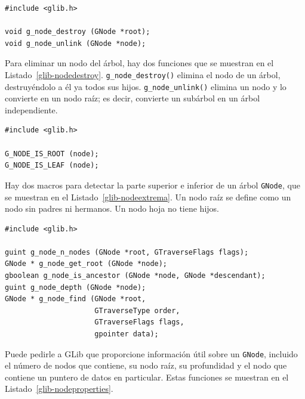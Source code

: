 \begin{lstlisting}[float, caption={Destruyendo un \lstinline{GNode}}, label=glib-nodedestroy]
#include <glib.h>

void g_node_destroy (GNode *root);
void g_node_unlink (GNode *node);
\end{lstlisting}

Para eliminar un nodo del árbol, hay dos funciones que se muestran en el Listado~\ref{glib-nodedestroy}. \lstinline{g_node_destroy()} elimina el nodo de un árbol, destruyéndolo a él ya todos sus hijos. \lstinline{g_node_unlink()} elimina un nodo y lo convierte en un nodo raíz; es decir, convierte un subárbol en un árbol independiente.

\begin{lstlisting}[float, caption={Predicados para \lstinline{GNode}}, label=glib-nodeextrema]
#include <glib.h>

G_NODE_IS_ROOT (node);
G_NODE_IS_LEAF (node);
\end{lstlisting}

Hay dos macros para detectar la parte superior e inferior de un árbol \lstinline{GNode}, que se muestran en el Listado~\ref{glib-nodeextrema}. Un nodo raíz se define como un nodo sin padres ni hermanos. Un nodo hoja no tiene hijos.

\begin{lstlisting}[float, caption={Propiedades de \lstinline{GNode}}, label=glib-nodeproperties]
#include <glib.h>

guint g_node_n_nodes (GNode *root, GTraverseFlags flags);
GNode * g_node_get_root (GNode *node);
gboolean g_node_is_ancestor (GNode *node, GNode *descendant);
guint g_node_depth (GNode *node);
GNode * g_node_find (GNode *root,
                     GTraverseType order,
                     GTraverseFlags flags,
                     gpointer data);
\end{lstlisting}

Puede pedirle a GLib que proporcione información útil sobre un \lstinline{GNode}, incluido el número de nodos que contiene, su nodo raíz, su profundidad y el nodo que contiene un puntero de datos en particular. Estas funciones se muestran en el Listado~\ref{glib-nodeproperties}.

